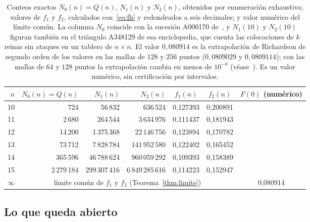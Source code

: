 \begin{table}[ht]
\centering
\small
\begin{tabular}{rrrrccc}
\toprule
$n$ & $N_0(n)=Q(n)$ & $N_1(n)$ & $N_2(n)$ & $f_1(n)$ & $f_2(n)$ & $F(0)$ (numérico)\\
\midrule
10 & 724 & 56\,832 & 636\,524 & 0{,}127393 & 0{,}200891 & \\
11 & 2\,680 & 264\,544 & 3\,634\,976 & 0{,}111437 & 0{,}181943 & \\
12 & 14\,200 & 1\,375\,368 & 22\,146\,756 & 0{,}123894 & 0{,}170782 & \\
13 & 73\,712 & 7\,828\,784 & 141\,952\,580 & 0{,}122402 & 0{,}165452 & \\
14 & 365\,596 & 46\,788\,624 & 960\,059\,292 & 0{,}109393 & 0{,}158389 & \\
15 & 2\,279\,184 & 299\,307\,416 & 6\,849\,285\,616 & 0{,}114223 & 0{,}152947 & \\
$\infty$ & \multicolumn{5}{c}{límite común de $f_1$ y $f_2$ (Teorema~\ref{thm:limite})} & 0{,}080914\\
\bottomrule
\end{tabular}
\caption{Conteos exactos $N_0(n)=Q(n)$, $N_1(n)$ y $N_2(n)$, obtenidos por enumeración
exhaustiva; valores de $f_1$ y $f_2$, calculados con~\eqref{eq:fh} y redondeados a seis
decimales; y valor numérico del límite común. La columna $N_0$ coincide con la sucesión A000170
de~\cite{OEIS}, y $N_1(10)$ y $N_2(10)$ figuran también en el triángulo A348129 de esa
enciclopedia, que cuenta las colocaciones de $k$ reinas sin ataques en un tablero de $n\times n$.
El valor $0{,}080914$ es la
extrapolación de Richardson de segundo orden de los valores en las mallas de $128$ y $256$ puntos
($0{,}0809029$ y $0{,}0809114$); con las mallas de $64$ y $128$ puntos la extrapolación cambia en
menos de $10^{-8}$ (véase~\cite[Sección~9]{Perfil}). Es un valor numérico, sin certificación por
intervalos.}
\label{tab:ilustracion}
\end{table}

\subsection{Lo que queda abierto}

